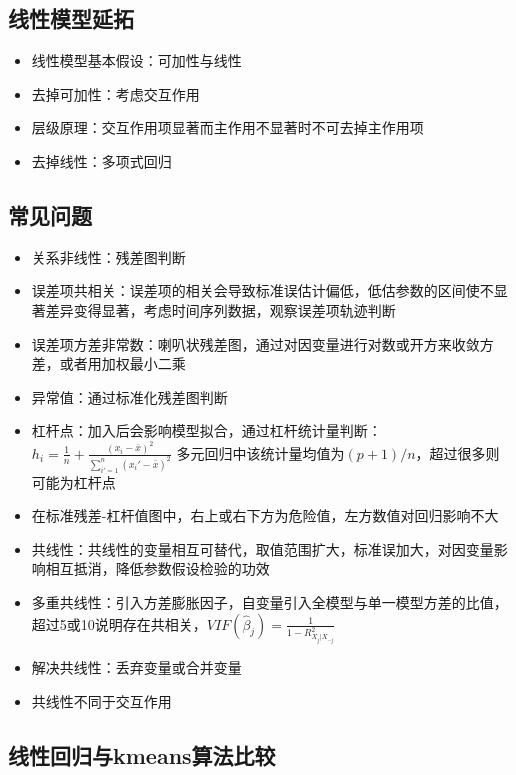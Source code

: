 \documentclass[]{book}
\providecommand{\tightlist}{%
  \setlength{\itemsep}{0pt}\setlength{\parskip}{0pt}}
\begin{document}
\hypertarget{ux7ebfux6027ux6a21ux578bux5ef6ux62d3}{%
\subsection{线性模型延拓}\label{ux7ebfux6027ux6a21ux578bux5ef6ux62d3}}

\begin{itemize}
\tightlist
\item
  线性模型基本假设：可加性与线性
\item
  去掉可加性：考虑交互作用
\item
  层级原理：交互作用项显著而主作用不显著时不可去掉主作用项
\item
  去掉线性：多项式回归
\end{itemize}

\hypertarget{ux5e38ux89c1ux95eeux9898-1}{%
\subsection{常见问题}\label{ux5e38ux89c1ux95eeux9898-1}}

\begin{itemize}
\tightlist
\item
  关系非线性：残差图判断
\item
  误差项共相关：误差项的相关会导致标准误估计偏低，低估参数的区间使不显著差异变得显著，考虑时间序列数据，观察误差项轨迹判断
\item
  误差项方差非常数：喇叭状残差图，通过对因变量进行对数或开方来收敛方差，或者用加权最小二乘
\item
  异常值：通过标准化残差图判断
\item
  杠杆点：加入后会影响模型拟合，通过杠杆统计量判断： \(h_i = \frac{1}{n} + \frac{(x_i - \bar x)^2}{\sum_{i' = 1}^{n} (x_i' - \bar x)^2}\) 多元回归中该统计量均值为\((p+1)/n\)，超过很多则可能为杠杆点
\item
  在标准残差-杠杆值图中，右上或右下方为危险值，左方数值对回归影响不大
\item
  共线性：共线性的变量相互可替代，取值范围扩大，标准误加大，对因变量影响相互抵消，降低参数假设检验的功效
\item
  多重共线性：引入方差膨胀因子，自变量引入全模型与单一模型方差的比值，超过5或10说明存在共相关，\(VIF(\hat \beta_j) = \frac{1}{1 - R^2_{X_j|X_{-j}}}\)
\item
  解决共线性：丢弃变量或合并变量
\item
  共线性不同于交互作用
\end{itemize}

\hypertarget{ux7ebfux6027ux56deux5f52ux4e0ekmeansux7b97ux6cd5ux6bd4ux8f83}{%
\subsection{线性回归与kmeans算法比较}\label{ux7ebfux6027ux56deux5f52ux4e0ekmeansux7b97ux6cd5ux6bd4ux8f83}}
\end{document}

